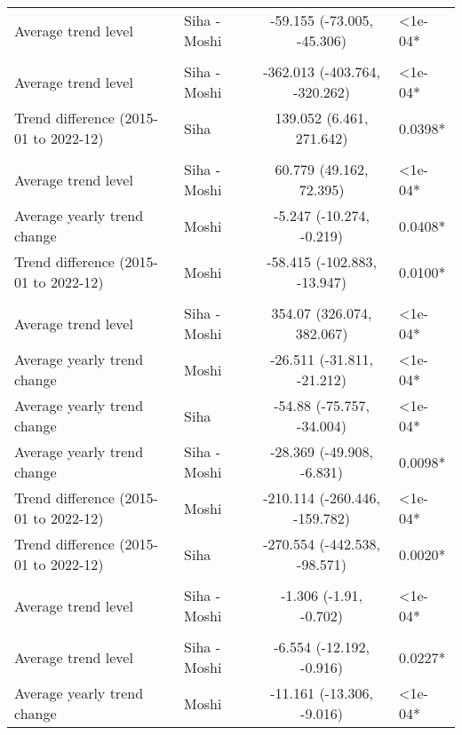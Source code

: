 \begin{longtable}{l|lcl}
\midrule\addlinespace[2.5pt]
\multicolumn{4}{l}{Fractures} \\[2.5pt] 
\midrule\addlinespace[2.5pt]
Average trend level & Siha - Moshi & -59.155 (-73.005, -45.306) & <1e-04* \\ 
\midrule\addlinespace[2.5pt]
\multicolumn{4}{l}{Hypertension} \\[2.5pt] 
\midrule\addlinespace[2.5pt]
Average trend level & Siha - Moshi & -362.013 (-403.764, -320.262) & <1e-04* \\ 
Trend difference (2015-01 to 2022-12) & Siha & 139.052 (6.461, 271.642) & 0.0398* \\ 
\midrule\addlinespace[2.5pt]
\multicolumn{4}{l}{Infectious Eye Disease} \\[2.5pt] 
\midrule\addlinespace[2.5pt]
Average trend level & Siha - Moshi & 60.779 (49.162, 72.395) & <1e-04* \\ 
Average yearly trend change & Moshi & -5.247 (-10.274, -0.219) & 0.0408* \\ 
Trend difference (2015-01 to 2022-12) & Moshi & -58.415 (-102.883, -13.947) & 0.0100* \\ 
\midrule\addlinespace[2.5pt]
\multicolumn{4}{l}{Intestinal Worms} \\[2.5pt] 
\midrule\addlinespace[2.5pt]
Average trend level & Siha - Moshi & 354.07 (326.074, 382.067) & <1e-04* \\ 
Average yearly trend change & Moshi & -26.511 (-31.811, -21.212) & <1e-04* \\ 
Average yearly trend change & Siha & -54.88 (-75.757, -34.004) & <1e-04* \\ 
Average yearly trend change & Siha - Moshi & -28.369 (-49.908, -6.831) & 0.0098* \\ 
Trend difference (2015-01 to 2022-12) & Moshi & -210.114 (-260.446, -159.782) & <1e-04* \\ 
Trend difference (2015-01 to 2022-12) & Siha & -270.554 (-442.538, -98.571) & 0.0020* \\ 
\midrule\addlinespace[2.5pt]
\multicolumn{4}{l}{Leprosy} \\[2.5pt] 
\midrule\addlinespace[2.5pt]
Average trend level & Siha - Moshi & -1.306 (-1.91, -0.702) & <1e-04* \\ 
\midrule\addlinespace[2.5pt]
\multicolumn{4}{l}{Malaria} \\[2.5pt] 
\midrule\addlinespace[2.5pt]
Average trend level & Siha - Moshi & -6.554 (-12.192, -0.916) & 0.0227* \\ 
Average yearly trend change & Moshi & -11.161 (-13.306, -9.016) & <1e-04* \\ 

\end{longtable}
